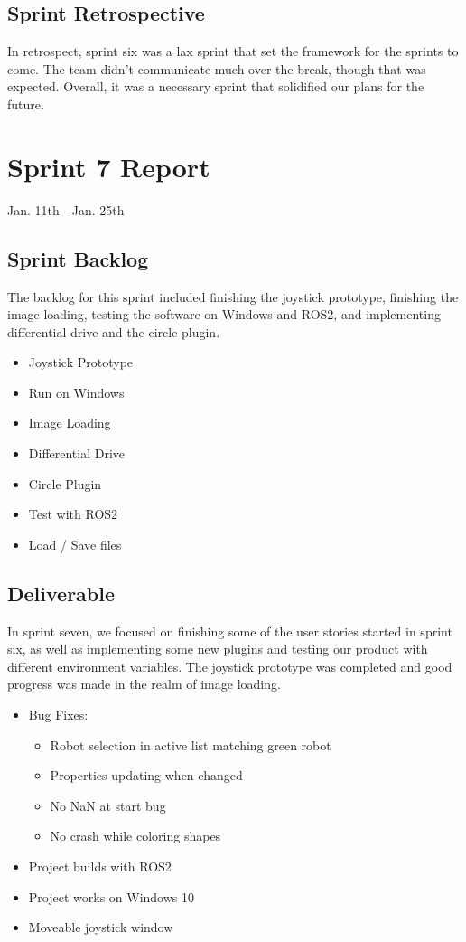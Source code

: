 \subsection{Sprint Retrospective}

In retrospect, sprint six was a lax sprint that set the framework for the sprints to come. The team didn't communicate much over the break, though that was expected. Overall, it was a necessary sprint that solidified our plans for the future.

\section{Sprint 7 Report}
Jan. 11th - Jan. 25th
\subsection{Sprint Backlog}

The backlog for this sprint included finishing the joystick prototype, finishing the image loading, testing the software on Windows and ROS2, and implementing differential drive and the circle plugin.

\begin{itemize}
	\item Joystick Prototype
	\item Run on Windows
	\item Image Loading
	\item Differential Drive
	\item Circle Plugin
	\item Test with ROS2
	\item Load / Save files
\end{itemize}

\subsection{Deliverable}

In sprint seven, we focused on finishing some of the user stories started in sprint six, as well as implementing some new plugins and testing our product with different environment variables. The joystick prototype was completed and good progress was made in the realm of image loading.

\begin{itemize}
	\item Bug Fixes:
	\begin{itemize}
		\item Robot selection in active list matching green robot
		\item Properties updating when changed
		\item No NaN at start bug
		\item No crash while coloring shapes	
	\end{itemize}
	\item Project builds with ROS2
	\item Project works on Windows 10
	\item Moveable joystick window
\end{itemize}


